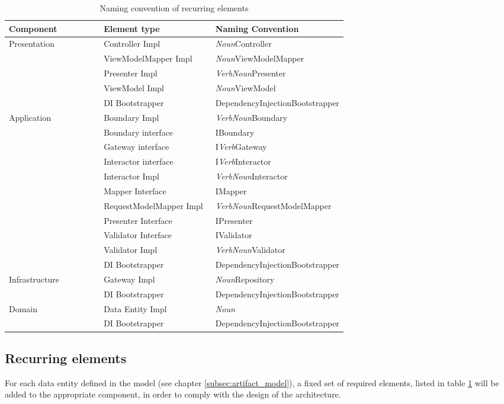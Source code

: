     \begin{table}[h]
        \small
        \begin{tabular}{ l p{0.33\linewidth} p{0.39\linewidth} }
        \hline
        \textbf{Component} & \textbf{Element type} & \textbf{Naming Convention} \\ \hline
        Presentation & Controller Impl & \textit{Noun}Controller \\
        & ViewModelMapper Impl & \textit{Noun}ViewModelMapper \\
        & Presenter Impl & \textit{VerbNoun}Presenter \\
        & ViewModel Impl & \textit{Noun}ViewModel \\
        & DI Bootstrapper & DependencyInjectionBootstrapper \\ \hline

        Application & Boundary Impl & \textit{VerbNoun}Boundary \\
        & Boundary interface & IBoundary \\
        & Gateway interface & I\textit{Verb}Gateway \\
        & Interactor interface & I\textit{Verb}Interactor \\
        & Interactor Impl & \textit{VerbNoun}Interactor \\
        & Mapper Interface & IMapper \\
        & RequestModelMapper Impl & \textit{VerbNoun}RequestModelMapper \\
        & Presenter Interface & IPresenter \\
        & Validator Interface & IValidator \\
        & Validator Impl & \textit{VerbNoun}Validator \\
        & DI Bootstrapper & DependencyInjectionBootstrapper \\ \hline
        
        Infrastructure & Gateway Impl & \textit{Noun}Repository \\
        & DI Bootstrapper & DependencyInjectionBootstrapper \\ \hline

        Domain & Data Entity Impl & \textit{Noun} \\
        & DI Bootstrapper & DependencyInjectionBootstrapper \\ \hline
        \end{tabular}
        \caption{Naming convention of recurring elements}
        \label{table:element_naming_convention}
        \end{table}

    \subsection{Recurring elements}
    
    For each data entity defined in the model (see chapter \ref{subsec:artifact_model}), a
    fixed set of required elements, listed in table \ref{table:element_naming_convention}
    will be added to the appropriate component, in order to comply with the design of the
    architecture.

